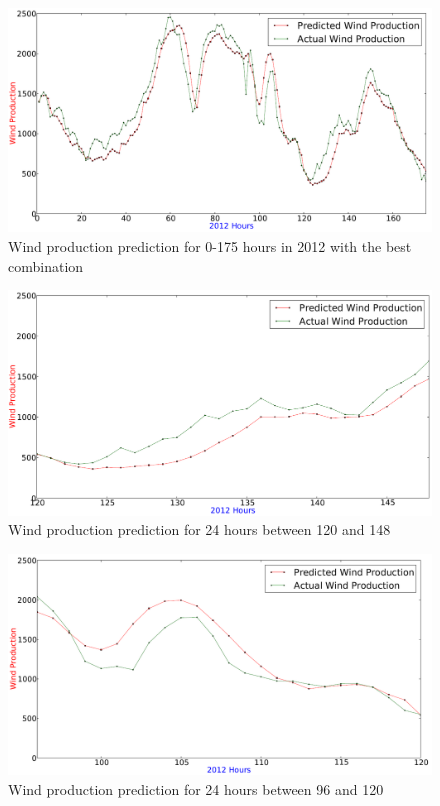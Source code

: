 \begin{figure}[h!]
\centering
\includegraphics[width=0.99\linewidth]{billeder/bestInputParameterPrediction.png}
\caption{Wind production prediction for 0-175 hours in 2012 with the best combination}
\label{fig:bestInputParameterPrediction}
\end{figure} 

\begin{figure}[h!]
\centering
\includegraphics[width=0.99\linewidth]{billeder/bestInputCombi120-148.png}
\caption{Wind production prediction for 24 hours between 120 and 148}
\label{fig:bestInputCombi120-148}
\end{figure} 

\begin{figure}[h!]
\centering
\includegraphics[width=0.99\linewidth]{billeder/bestInputCombi96-120.png}
\caption{Wind production prediction for 24 hours between 96 and 120}
\label{fig:bestInputCombi96-120}
\end{figure}   


